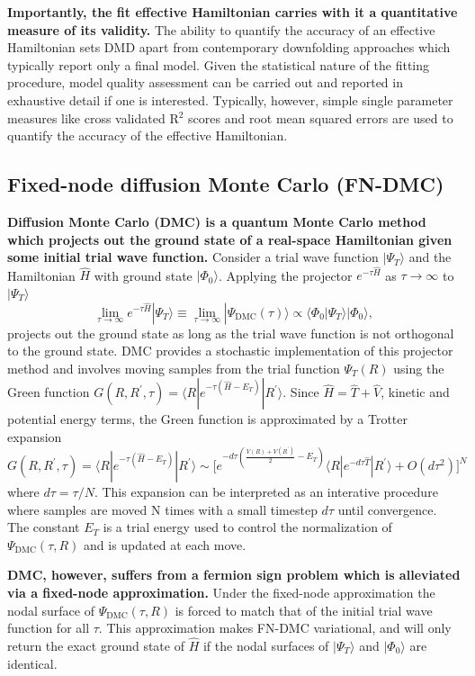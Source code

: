 \documentclass[12pt]{article}
\begin{document}
\textbf{Importantly, the fit effective Hamiltonian carries with it a quantitative measure of its validity.}
The ability to quantify the accuracy of an effective Hamiltonian sets DMD apart from contemporary downfolding approaches which typically report only a final model.
Given the statistical nature of the fitting procedure, model quality assessment can be carried out and reported in exhaustive detail if one is interested.
Typically, however, simple single parameter measures like cross validated R$^2$ scores and root mean squared errors are used to quantify the accuracy of the effective Hamiltonian.

\subsection{Fixed-node diffusion Monte Carlo (FN-DMC)}
\textbf{Diffusion Monte Carlo (DMC) is a quantum Monte Carlo method which projects out the ground state of a real-space Hamiltonian given some initial trial wave function.}
Consider a trial wave function $|\Psi_T\rangle$ and the Hamiltonian $\hat{H}$ with ground state $|\Phi_0\rangle$. 
Applying the projector $e^{-\tau \hat{H}}$ as $\tau \rightarrow \infty$ to $|\Psi_T \rangle$
\begin{equation}
\lim_{\tau \rightarrow \infty} e^{-\tau \hat{H}} |\Psi_T\rangle 
\equiv \lim_{\tau \rightarrow \infty} |\Psi_\text{DMC}(\tau)\rangle \propto \langle \Phi_0|\Psi_T\rangle |\Phi_0\rangle,
\end{equation}
projects out the ground state as long as the trial wave function is not orthogonal to the ground state. 
DMC provides a stochastic implementation of this projector method and involves moving samples from the trial function $\Psi_T(R)$ using the Green function $G(R, R^\prime, \tau) = \langle R | e^{-\tau(\hat{H} - E_T)} | R^\prime \rangle$. 
Since $\hat{H} = \hat{T} + \hat{V}$, kinetic and potential energy terms, the Green function is approximated by a Trotter expansion $G(R, R^\prime, \tau) = \langle R | e^{-\tau(\hat{H} - E_T)} | R^\prime \rangle \sim \Big[e^{-d\tau(\frac{V(R) + V(R^\prime)}{2} - E_T)} \langle R| e^{-d\tau\hat{T}}|R^\prime \rangle + O(d\tau^2) \Big]^N $ where $d\tau = \tau/N$.
This expansion can be interpreted as an interative procedure where samples are moved N times with a small timestep $d\tau$ until convergence.
The constant $E_T$ is a trial energy used to control the normalization of $\Psi_\text{DMC}(\tau, R)$ and is updated at each move.

\textbf{DMC, however, suffers from a fermion sign problem which is alleviated via a fixed-node approximation.}
Under the fixed-node approximation the nodal surface of $\Psi_\text{DMC}(\tau, R)$ is forced to match that of the initial trial wave function for all $\tau$.
This approximation makes FN-DMC variational, and will only return the exact ground state of $\hat{H}$ if the nodal surfaces of $|\Psi_T\rangle$ and $|\Phi_0\rangle$ are identical.
\end{document}
